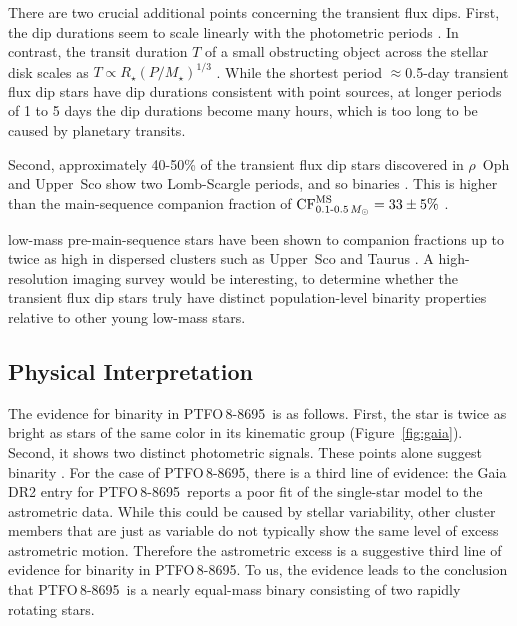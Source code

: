 \documentclass[12pt,twocolumn,tighten,trackchanges]{aastex62}
\newcommand{\ptfo}{PTFO$\,$8-8695}
\begin{document}
There are two crucial additional points concerning the transient flux
dips.  First, the dip durations seem to scale linearly with the
photometric periods \citep[][Figure~26]{stauffer_orbiting_2017}.  In
contrast, the transit duration $T$ of a small obstructing object
across the stellar disk scales as $T \propto R_\star
(P/M_\star)^{1/3}$ \citep{winn_exoplanet_2010}.  While the shortest
period $\approx$0.5-day transient flux dip stars have dip durations
consistent with point sources, at longer periods of 1 to 5 days the
dip durations become many hours, which is too long to be caused by
planetary transits.

Second, approximately 40-50\% of the transient flux dip stars
discovered in $\rho$~Oph and Upper~Sco show two Lomb-Scargle periods,
and so  binaries
\citep[][Table~1]{stauffer_orbiting_2017}.  This is higher than the
main-sequence companion fraction of ${\rm
CF}_{0.1\text{-}0.5\,M_\odot}^{\rm MS} = 33 \pm 5\%$
\citep{henry_solar_2006,duchene_stellar_2013,winters_solar_2019}.

 low-mass pre-main-sequence stars 
have been shown to  companion fractions up to twice as
high in dispersed clusters such as Upper~Sco and Taurus
\citep{kraus_mapping_2008,kraus_mapping_2011}.  A high-resolution
imaging survey would be interesting, to determine whether the
transient flux dip stars truly have distinct population-level binarity
properties relative to other young low-mass stars.


\subsection{Physical Interpretation}
\label{subsec:physical}

The evidence for binarity in \ptfo\ is as follows.  First, the star is
twice as bright as stars of the same color in its kinematic group
(Figure~\ref{fig:gaia}).  Second, it shows two distinct photometric
signals.  These points alone suggest binarity
\citep{stauffer_rotevol_2018}.  For the case of \ptfo, there is a
third line of evidence: the Gaia DR2 entry for \ptfo\ reports a poor
fit of the single-star model to the astrometric data.  While this
could be caused by stellar variability, other cluster members that are
just as variable do not typically show the same level of excess
astrometric motion.  Therefore the astrometric excess is a suggestive
third line of evidence for binarity in \ptfo. To us, the evidence
leads to the conclusion that \ptfo\ is a nearly equal-mass binary
consisting of two rapidly rotating stars.
\end{document}
